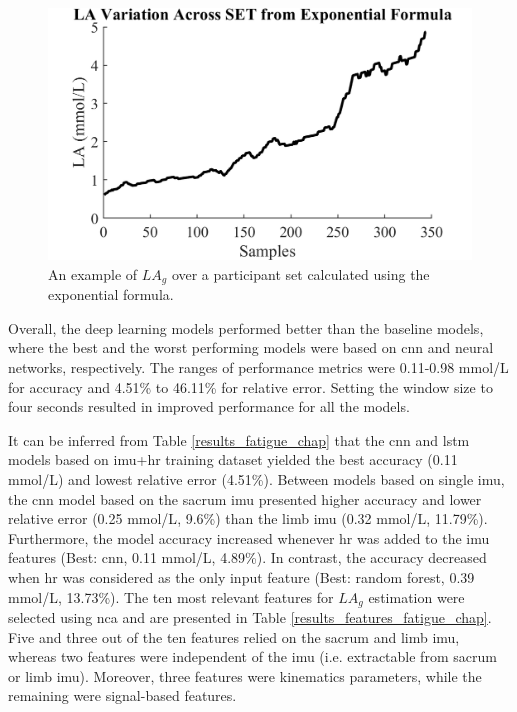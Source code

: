 


\begin{figure}[htb]
\centering
\includegraphics[width=.65\linewidth]{chapters/fatigue/figures/Picture6.png}
\caption{An example of $LA_g$ over a participant \gls{set} calculated using the exponential formula.}
\label{result_lac_fatigue_chap}
\end{figure}

Overall, the deep learning models performed better than the baseline models, where the best and the worst performing models were based on \gls{cnn} and neural networks, respectively. The ranges of performance metrics were 0.11-0.98 \gls{mmol/L} for accuracy and 4.51\% to 46.11\% for relative error. Setting the window size to four seconds resulted in improved performance for all the models. 

 It can be inferred from Table \ref{results_fatigue_chap} that the \gls{cnn} and \gls{lstm} models based on \gls{imu}+\gls{hr} training dataset yielded the best accuracy (0.11 \gls{mmol/L}) and lowest relative error (4.51\%). Between models based on single \gls{imu}, the \gls{cnn} model based on the sacrum \gls{imu} presented higher accuracy and lower relative error (0.25 \gls{mmol/L}, 9.6\%) than the limb \gls{imu} (0.32 \gls{mmol/L}, 11.79\%). Furthermore, the model accuracy increased whenever \gls{hr} was added to the \gls{imu} features (Best: \gls{cnn}, 0.11 \gls{mmol/L}, 4.89\%). In contrast, the accuracy decreased when \gls{hr} was considered as the only input feature (Best: random forest, 0.39 \gls{mmol/L}, 13.73\%).  
 The ten most relevant features for $LA_g$ estimation were selected using \gls{nca} and are presented in Table \ref{results_features_fatigue_chap}. Five and three out of the ten features relied on the sacrum and limb \gls{imu}, whereas two features were independent of the \gls{imu} (i.e. extractable from sacrum or limb \gls{imu}). Moreover, three features were kinematics parameters, while the remaining were signal-based features. 

